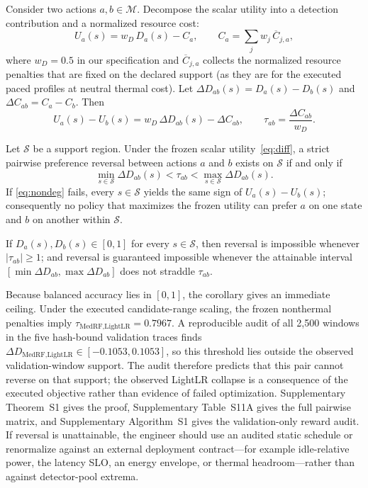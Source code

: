 Consider two actions $a,b\in\mathcal M$. Decompose the scalar utility into a detection contribution and a normalized resource cost:
\begin{equation}
    U_a(s) = w_D\, D_a(s) - C_a,\qquad C_a=\sum_j w_j\,\overline C_{j,a},
\end{equation}
where $w_D=0.5$ in our specification and $\overline C_{j,a}$ collects the normalized resource penalties that are fixed on the declared support (as they are for the executed paced profiles at neutral thermal cost). Let $\Delta D_{ab}(s)=D_a(s)-D_b(s)$ and $\Delta C_{ab}=C_a-C_b$. Then
\begin{equation}\label{eq:diff}
    U_a(s)-U_b(s) = w_D\,\Delta D_{ab}(s) - \Delta C_{ab},\qquad
    \tau_{ab}=\frac{\Delta C_{ab}}{w_D}.
\end{equation}

\begin{theorem}\label{thm:nondeg}
Let $\mathcal S$ be a support region. Under the frozen scalar utility~\eqref{eq:diff}, a strict pairwise preference reversal between actions $a$ and $b$ exists on $\mathcal S$ if and only if
\begin{equation}\label{eq:nondeg}
    \min_{s\in\mathcal S}\Delta D_{ab}(s) < \tau_{ab} < \max_{s\in\mathcal S}\Delta D_{ab}(s).
\end{equation}
If \eqref{eq:nondeg} fails, every $s\in\mathcal S$ yields the same sign of $U_a(s)-U_b(s)$; consequently no policy that maximizes the frozen utility can prefer $a$ on one state and $b$ on another within $\mathcal S$.
\end{theorem}

\begin{corollary}\label{cor:bound}
If $D_a(s),D_b(s)\in[0,1]$ for every $s\in\mathcal S$, then reversal is impossible whenever $|\tau_{ab}|\ge 1$; and reversal is guaranteed impossible whenever the attainable interval $[\min\Delta D_{ab},\max\Delta D_{ab}]$ does not straddle $\tau_{ab}$.
\end{corollary}

Because balanced accuracy lies in $[0,1]$, the corollary gives an immediate ceiling. Under the executed candidate-range scaling, the frozen nonthermal penalties imply $\tau_{\text{MedRF},\text{LightLR}}=0.7967$. A reproducible audit of all 2{,}500 windows in the five hash-bound validation traces finds $\Delta D_{\text{MedRF},\text{LightLR}}\in[-0.1053,0.1053]$, so this threshold lies outside the observed validation-window support. The audit therefore predicts that this pair cannot reverse on that support; the observed LightLR collapse is a consequence of the executed objective rather than evidence of failed optimization. Supplementary Theorem~S1 gives the proof, Supplementary Table~S11A gives the full pairwise matrix, and Supplementary Algorithm~S1 gives the validation-only reward audit. If reversal is unattainable, the engineer should use an audited static schedule or renormalize against an external deployment contract---for example idle-relative power, the latency SLO, an energy envelope, or thermal headroom---rather than against detector-pool extrema.

